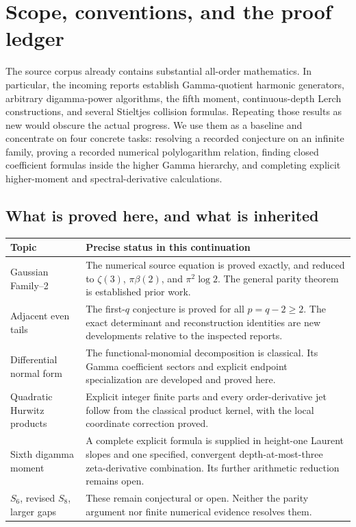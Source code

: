 \section{Scope, conventions, and the proof ledger}
\label{scope:sec}

The source corpus already contains substantial all-order mathematics.
In particular, the incoming reports \cite{SourceCanonical,SourceHigher} establish Gamma-quotient harmonic
generators, arbitrary digamma-power algorithms, the fifth moment,
continuous-depth Lerch constructions, and several Stieltjes collision
formulas.  Repeating those results as new would obscure the actual
progress.  We use them as a baseline and concentrate on four concrete
tasks: resolving a recorded conjecture on an infinite family, proving a
recorded numerical polylogarithm relation, finding closed coefficient
formulas inside the higher Gamma hierarchy, and completing explicit
higher-moment and spectral-derivative calculations.

\subsection{What is proved here, and what is inherited}

\begin{center}
\small
\begin{tabularx}{\textwidth}{@{}p{}X@{}}
\toprule
Topic & Precise status in this continuation \\
\midrule
Gaussian Family--2 & The numerical source equation is proved exactly,
and reduced to $\zeta(3)$, $\pi\beta(2)$, and $\pi^2\log2$.
The general parity theorem is established prior work. \\
Adjacent even tails & The first-$q$ conjecture is proved for all
$p=q-2\ge2$.  The exact determinant and reconstruction identities
are new developments relative to the inspected reports. \\
Differential normal form & The functional-monomial decomposition is
classical.  Its Gamma coefficient sectors and explicit endpoint
specialization are developed and proved here. \\
Quadratic Hurwitz products & Explicit integer finite parts and every
order-derivative jet follow from the classical product kernel, with
the local coordinate correction proved. \\
Sixth digamma moment & A complete explicit formula is supplied in
height-one Laurent slopes and one specified, convergent depth-at-most-three
zeta-derivative combination.  Its further arithmetic reduction remains open. \\
$S_6$, revised $S_8$, larger gaps & These remain conjectural or open.
Neither the parity argument nor finite numerical evidence resolves them. \\
\bottomrule
\end{tabularx}
\end{center}

